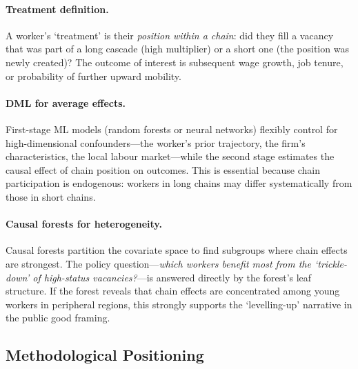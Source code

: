 \documentclass[a4paper]{tufte-handout}
\begin{document}
\paragraph{Treatment definition.}
A worker's `treatment' is their \emph{position within a chain}: did they fill a vacancy that was part of a long cascade (high multiplier) or a short one (the position was newly created)? The outcome of interest is subsequent wage growth, job tenure, or probability of further upward mobility.

\paragraph{DML for average effects.}
First-stage ML models (random forests or neural networks) flexibly control for high-dimensional confounders---the worker's prior trajectory, the firm's characteristics, the local labour market---while the second stage estimates the causal effect of chain position on outcomes. This is essential because chain participation is endogenous: workers in long chains may differ systematically from those in short chains.

\paragraph{Causal forests for heterogeneity.}
Causal forests partition the covariate space to find subgroups where chain effects are strongest. The policy question---\emph{which workers benefit most from the `trickle-down' of high-status vacancies?}---is answered directly by the forest's leaf structure. If the forest reveals that chain effects are concentrated among young workers in peripheral regions, this strongly supports the `levelling-up' narrative in the public good framing.


\subsection{Methodological Positioning}
\end{document}
